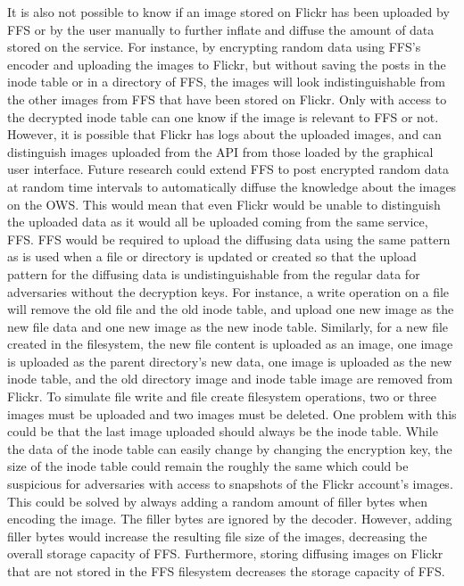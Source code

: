 It is also not possible to know if an image stored on Flickr has been uploaded by \gls{FFS} or by the user manually to further inflate and diffuse the amount of data stored on the service. For instance, by encrypting random data using \gls{FFS}'s encoder and uploading the images to Flickr, but without saving the posts in the inode table or in a directory of \gls{FFS}, the images will look indistinguishable from the other images from \gls{FFS} that have been stored on Flickr. Only with access to the decrypted inode table can one know if the image is relevant to \gls{FFS} or not. However, it is possible that Flickr has logs about the uploaded images, and can distinguish images uploaded from the \gls{API} from those loaded by the graphical user interface. Future research could extend \gls{FFS} to post encrypted random data at random time intervals to automatically diffuse the knowledge about the images on the \gls{OWS}. This would mean that even Flickr would be unable to distinguish the uploaded data as it would all be uploaded coming from the same service, \ie \gls{FFS}. \gls{FFS} would be required to upload the diffusing data using the same pattern as is used when a file or directory is updated or created so that the upload pattern for the diffusing data is undistinguishable from the regular data for adversaries without the decryption keys. For instance, a write operation on a file will remove the old file and the old inode table, and upload one new image as the new file data and one new image as the new inode table. Similarly, for a new file created in the filesystem, the new file content is uploaded as an image, one image is uploaded as the parent directory's new data, one image is uploaded as the new inode table, and the old directory image and inode table image are removed from Flickr. To simulate file write and file create filesystem operations, two or three images must be uploaded and two images must be deleted. One problem with this could be that the last image uploaded should always be the inode table. While the data of the inode table can easily change by changing the encryption key, the size of the inode table could remain the roughly the same which could be suspicious for adversaries with access to snapshots of the Flickr account's images. This could be solved by always adding a random amount of filler bytes when encoding the image. The filler bytes are ignored by the decoder. However, adding filler bytes would increase the resulting file size of the images, decreasing the overall storage capacity of \gls{FFS}. Furthermore, storing diffusing images on Flickr that are not stored in the \gls{FFS} filesystem decreases the storage capacity of \gls{FFS}.



